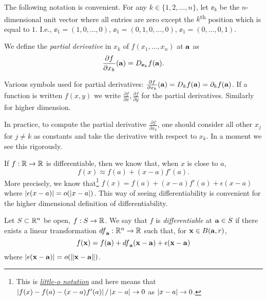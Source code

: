 The following notation is convenient.
For any \(k\in\{1,2,\ldots,n\}\),
let \(\ee_k\) be the \(n\)-dimensional unit vector where all entries are zero except the \(k\)\textsuperscript{th} position which is equal to \(1\).
I.e., \( \ee_1=(1,0,\ldots,0)  \),  \( \ee_1=(0,1,0,\ldots,0)  \),  \( \ee_1=(0,\ldots,0,1)  \).

\begin{definition}
    We define the \emph{partial derivative} in \(x_k\) of \(f(x_1,\ldots,x_n)\) at \(\aa\) as
    \[
        \frac{\partial f}{\partial x_k}(\aa) = D_{\ee_k}f(\aa).
    \]
\end{definition}


\begin{remark*}
    Various symbols used for partial derivatives:
    \(\frac{\partial f}{\partial x_k}(\aa) = D_k f(\aa) = \partial_{k}f(\aa)\).
    If  a function is written \(f(x,y)\) we write \(\frac{\partial f}{\partial x}, \frac{\partial f}{\partial y}\) for the partial derivatives. Similarly for higher dimension.
\end{remark*}

In practice, to compute the partial derivative \( \frac{\partial f}{\partial x_k}\), one should consider all other \(x_j\) for \(j\neq k\) as constants and take the derivative with respect to \(x_k\).
In a moment we see this rigorously.


If \(f:\bR \to \bR\) is differentiable, then we know that, when \(x\) is close to \(a\),
\[
    f(x) \approx f(a) + (x-a) f'(a).
\]
More precisely, we know that\footnote{This is \href{https://en.wikipedia.org/wiki/Big_O_notation\#Little-o_notation}{\emph{little-o notation}} and here means that \(\abs{f(x) - f(a) - (x-a) f'(a)}/\abs{x-a} \to 0\) as \(\abs{x-a}\to 0\).  } \(f(x) = f(a) + (x-a) f'(a) + \epsilon(x-a)\) where \(\abs{\epsilon(x-a)} = \littleo{\abs{x-a}}\).
This way of seeing differentiability is convenient for the higher dimensional definition of differentiability.

\begin{definition}[differentiable]%
    \label{def:differentiable}
    Let \(S\subset \bR^n\) be open, \(f:S \to \bR\).
    We say that \(f\) is \emph{differentiable} at \(\aa \in S\) if there exists a linear transformation \({df}_{\aa}: \bR^n \to \bR\) such that, for \(\xx \in B(\aa,r)\),
    \[
        f(\xx) = f(\aa) + {df}_{\aa}(\xx-\aa) + \epsilon(\xx-\aa)
    \]
    where \(\abs{\epsilon(\xx-\aa)} = \littleo{\norm{\xx-\aa}}\).
\end{definition}


